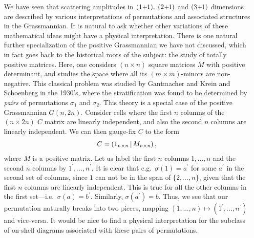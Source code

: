 \documentclass[12pt,hyperref,compress]{JHEP3}
\newcommand{\eq}[1]{\begin{equation}#1\end{equation}}
\newcommand{\pl}{\hspace{0.5pt}\text{{\small+}}\hspace{-0.5pt}}
\begin{document}
We have seen that scattering amplitudes in $(1\pl1),$ $(2\pl1)$ and $(3\pl1)$ dimensions are described by various interpretations of permutations and associated structures in the Grassmannian. It is natural to ask whether other variations of these mathematical ideas might have a physical interpretation. There is one natural further specialization of the positive Grassmannian we have not discussed, which in fact goes back to the historical roots of the subject: the study of totally positive matrices. Here, one considers $(n\!\times\!n)$ square matrices $M$ with positive determinant, and studies the space where all its $(m\!\times\!m)$-minors are non-negative. This classical problem was studied by Gantmacher and Krein \cite{GKr} and Schoenberg \cite{Sch} in the 1930's, where the stratification was found to be determined by {\it pairs} of permutations $\sigma_1$ and $\sigma_2$. This theory is a special case of the positive Grassmannian $G(n,2n)$. Consider cells where the first $n$ columns of the $(n\!\times2n)$ $C$ matrix are linearly independent, and also the second $n$ columns are linearly independent. We can then gauge-fix $C$ to the form
\vspace{-.2cm}\eq{C = \left(1_{n \times n} \, |\, M_{n \times n} \right),\vspace{-.2cm}}
where $M$ is a positive matrix. Let us label the first $n$ columns $1, \ldots, n$ and the second $n$ columns by $1^\prime, \ldots, n^\prime$. It is clear that e.g.\ $\sigma(1) = a^\prime$ for some $a^\prime$ in the second set of columns, since $1$ can not be in the span of $\{2, \ldots, n\}$, given that the first $n$ columns are linearly independent. This is true for all the other columns in the first set---i.e.\ $\sigma(a) = b^\prime$. Similarly, $\sigma(a^\prime) = b$. Thus, we see that our permutation naturally breaks into two pieces, mapping $(1, \ldots, n)\!\mapsto\!(1^\prime,\ldots, n^\prime)$ and vice-versa. It would be nice to find a physical interpretation for the subclass of on-shell diagrams associated with these pairs of permutations.
\end{document}
